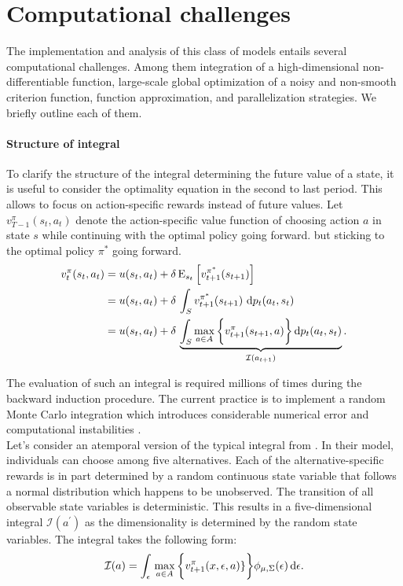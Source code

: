 \section{Computational challenges}\label{Computation}
The implementation and analysis of this class of models entails several computational challenges. Among them integration of a high-dimensional non-differentiable function, large-scale global optimization of a noisy and non-smooth criterion function, function approximation, and parallelization strategies. We briefly outline each of them. 
\paragraph{Structure of integral} To clarify the structure of the integral determining the future value of a state, it is useful to consider the optimality equation in the second to last period. This allows to focus on action-specific rewards instead of future values. Let $v^{\pi}_{T-1}(s_t, a_t)$ denote the action-specific value function of choosing action $a$ in state $s$ while continuing with the optimal policy going forward.
but sticking to the optimal policy $\pi^*$ going forward.
%
\begin{align}
v^{\pi}_{t}(s_t, a_t) & = u(s_t, a_t) + \delta\,\mathrm{E}_{s_t} \left[v^{\pi^*}_{t + 1}(s_{t + 1})\right] \\
& =  u(s_t, a_t) + \delta\, \int_S v^{\pi^*}_{t + 1}(s_{t + 1})\, \mathop{}\!\mathrm{d} p_t(a_t, s_t)\\
& =  u(s_t, a_t) + \delta\, \underbrace{\int_S \max_{a \in A}\bigg\{v^\pi_{t + 1}(s_{t + 1}, a)\bigg\}\mathop{}\!\mathrm{d} p_t(a_t, s_t)}_{\mathcal{I}(a_{t + 1})}.
\end{align}

The evaluation of such an integral is required millions of times during the backward induction procedure. The current practice is to implement a random Monte Carlo integration which introduces considerable numerical error and computational instabilities \citep{Judd.2011}.\\

Let's consider an atemporal version of the typical integral from \citet{Keane.1997}. In their model, individuals can choose among five alternatives. Each of the alternative-specific rewards is in part determined by a random continuous state variable that follows a normal distribution which happens to be unobserved. The transition of all observable state variables is deterministic. This results in a five-dimensional integral $\mathcal{I}(a^\prime)$ as the dimensionality is determined by the random state variables. The integral takes the following form:
%
\begin{align*}
\mathcal{I}(a) = \int_{\epsilon}\, \max_{a\in A} \bigg\{v^\pi_{t + 1}(x, \epsilon, a)\}\bigg\} \phi_{\mu, \Sigma}(\epsilon) \mathop{}\!\mathrm{d}\epsilon.
\end{align*}

